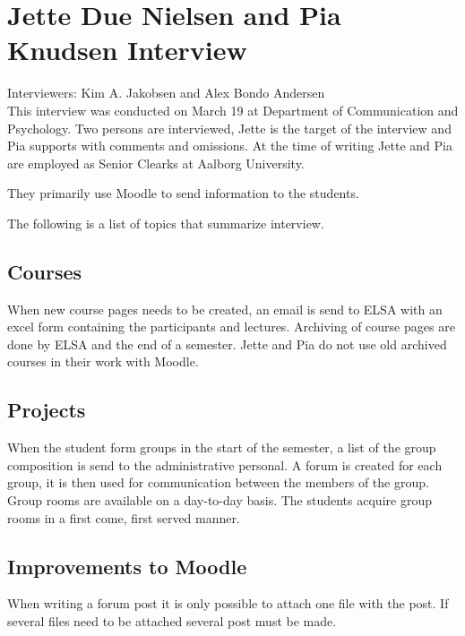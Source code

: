 \section{Jette Due Nielsen and Pia Knudsen Interview}
\label{sec:jettePia}
Interviewers: Kim A. Jakobsen and Alex Bondo Andersen\\

This interview was conducted on March 19\ths{} at Department of Communication and Psychology.
Two persons are interviewed, Jette is the target of the interview and Pia supports with comments and omissions. 
At the time of writing Jette and Pia are employed as Senior Clearks at Aalborg University.

They primarily use Moodle to send information to the students. 

The following is a list of topics that summarize interview.

\subsection*{Courses}
When new course pages needs to be created, an email is send to ELSA with an excel form containing the participants and lectures.
Archiving of course pages are done by ELSA and the end of a semester. 
Jette and Pia do not use old archived courses in their work with Moodle.

\subsection*{Projects}
When the student form groups in the start of the semester, a list of the group composition is send to the administrative personal. 
A forum is created for each group, it is then used for communication between the members of the group.
Group rooms are available on a day-to-day basis.
The students acquire group rooms in a first come, first served manner.

\subsection*{Improvements to Moodle}
When writing a forum post it is only possible to attach one file with the post. 
If several files need to be attached several post must be made. 
